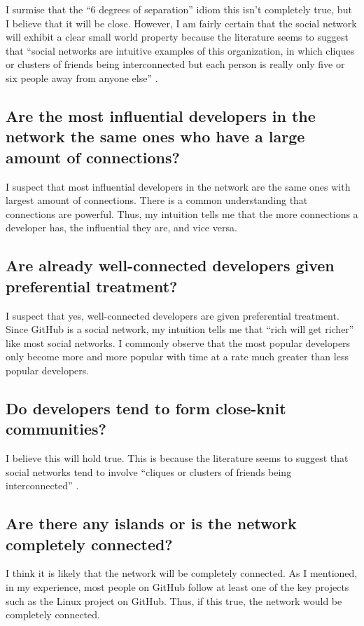 \documentclass[9pt,twocolumn,twoside]{pnas-new}
\begin{document}
I surmise that the “6 degrees of separation” idiom this isn’t completely true, but I believe that it will be close. However, I am fairly certain that the social network will exhibit a clear small world property because the literature seems to suggest that “social networks are intuitive examples of this organization, in which cliques or clusters of friends being interconnected but each person is really only five or six people away from anyone else” \cite{PMC3604768}.

\subsection*{Are the most influential developers in the network the same ones who have a large amount of connections?}

I suspect that most influential developers in the network are the same ones with largest amount of connections. There is a common understanding that connections are powerful. Thus, my intuition tells me that the more connections a developer has, the influential they are, and vice versa.

\subsection*{Are already well-connected developers given preferential treatment?}

I suspect that yes, well-connected developers are given preferential treatment. Since GitHub is a social network, my intuition tells me that “rich will get richer” like most social networks. I commonly observe that the most popular developers only become more and more popular with time at a rate much greater than less popular developers.

\subsection*{Do developers tend to form close-knit communities?}

I believe this will hold true. This is because the literature seems to suggest that social networks tend to involve “cliques or clusters of friends being interconnected” \cite{PMC3604768}.

\subsection*{Are there any islands or is the network completely connected?}

I think it is likely that the network will be completely connected. As I mentioned, in my experience, most people on GitHub follow at least one of the key projects such as the Linux project on GitHub. Thus, if this true, the network would be completely connected.
\end{document}
